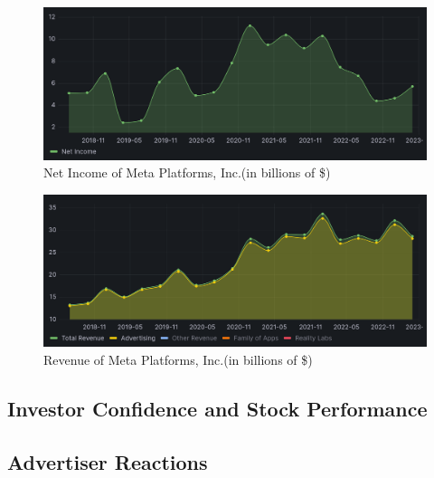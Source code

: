 \documentclass[12pt, a4paper]{article}
\begin{document}
\begin{figure}[h]
    \centering
    \includegraphics[width=1.00\textwidth]{net-income}
    \caption{Net Income of Meta Platforms, Inc.(in billions of
    \$)\cite{2023q1,2020q4,2020q3,2020q2,2020q1,2019q4,2019q3,2019q2,2019q1,2018q4,2018q3,2018q2}}
    \label{fig:net-income}
\end{figure}

\begin{figure}[h]
    \centering
    \includegraphics[width=1.00\textwidth]{revenue}
    \caption{Revenue of Meta Platforms, Inc.(in billions of
    \$)\cite{2023q1,2020q4,2020q3,2020q2,2020q1,2019q4,2019q3,2019q2,2019q1,2018q4,2018q3,2018q2}}
    \label{fig:revenue}
\end{figure}


\subsection*{Investor Confidence and Stock Performance}




\subsection*{Advertiser Reactions}
\end{document}
